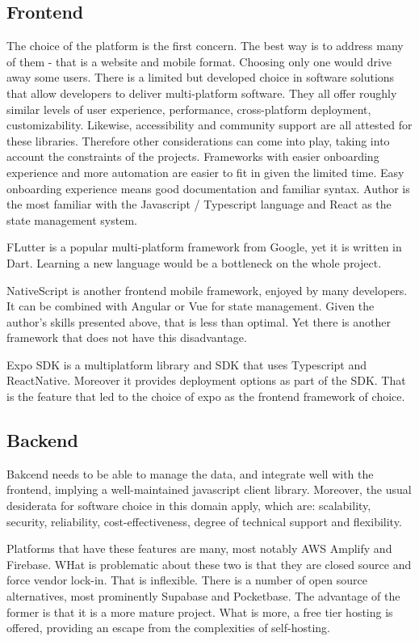 \documentclass{report}
\begin{document}
\subsection{Frontend}
The choice of the platform is the first concern. The best way is to address many of them - that is a website and mobile format. Choosing only one would drive away some users. 
There is a limited but developed choice in software solutions that allow developers to deliver multi-platform software. They all offer roughly similar levels of user experience, performance, cross-platform deployment, customizability. Likewise, accessibility and community support are all attested for these libraries.
Therefore other considerations can come into play, taking into account the constraints of the projects. Frameworks with easier onboarding experience and more automation are easier to fit in given the limited time. Easy onboarding experience means good documentation and familiar syntax.
Author is the most familiar with the Javascript / Typescript language and React as the state management system.

FLutter is a popular multi-platform framework from Google, yet it is written in Dart. Learning a new language would be a bottleneck on the whole project.
\cite{noauthor_flutter_nodate}

NativeScript is another frontend mobile framework, enjoyed by many developers. It can be combined with Angular or Vue for state management.
\cite{noauthor_nativescript_nodate}
Given the author's skills presented above, that is less than optimal. Yet there is another framework that does not have this disadvantage.

Expo SDK is a multiplatform library and SDK that uses Typescript and ReactNative.
Moreover it provides deployment options as part of the SDK. That is the feature that led to the choice of expo as the frontend framework of choice. 

\subsection{Backend}

Bakcend needs to be able to manage the data, and integrate well with the frontend, implying a well-maintained javascript client library.
Moreover, the usual desiderata for software choice in this domain apply, which are: scalability, security, reliability, cost-effectiveness, degree of technical support and flexibility. 

Platforms that have these features are many, most notably AWS Amplify and Firebase. WHat is problematic about these two is that they are closed source and force vendor lock-in. 
\cite{noauthor_firebase_2023}
\cite{noauthor_aws-amplifyamplify-js_2023}
That is inflexible. There is a number of open source alternatives, most prominently Supabase and Pocketbase. 
\cite{noauthor_supabase-js_2023} \cite{noauthor_pocketbase_2023}
The advantage of the former is that it is a more mature project. What is more, a free tier hosting is offered, providing an escape from the complexities of self-hosting. 
\cite{noauthor_pocketbase_nodate}
\end{document}
